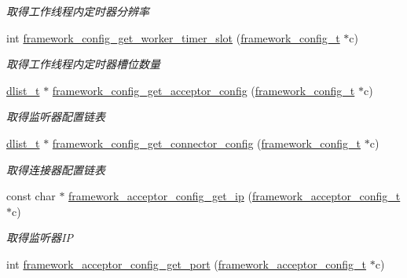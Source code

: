 \begin{DoxyCompactItemize}
\begin{DoxyCompactList}\small\item\em 取得工作线程内定时器分辨率 \end{DoxyCompactList}\item 
int \hyperlink{a00056_a644262b6c9e1d4dc33665782f3a27285_a644262b6c9e1d4dc33665782f3a27285}{framework\+\_\+config\+\_\+get\+\_\+worker\+\_\+timer\+\_\+slot} (\hyperlink{a00051_a55b26efa9e6ee05514d087ba2593a54b_a55b26efa9e6ee05514d087ba2593a54b}{framework\+\_\+config\+\_\+t} $\ast$c)
\begin{DoxyCompactList}\small\item\em 取得工作线程内定时器槽位数量 \end{DoxyCompactList}\item 
\hyperlink{a00051_ad6644d67df4b4e3596c1eb12977d1d16_ad6644d67df4b4e3596c1eb12977d1d16}{dlist\+\_\+t} $\ast$ \hyperlink{a00056_a83bfc56ba855d7e63fe8d02826925873_a83bfc56ba855d7e63fe8d02826925873}{framework\+\_\+config\+\_\+get\+\_\+acceptor\+\_\+config} (\hyperlink{a00051_a55b26efa9e6ee05514d087ba2593a54b_a55b26efa9e6ee05514d087ba2593a54b}{framework\+\_\+config\+\_\+t} $\ast$c)
\begin{DoxyCompactList}\small\item\em 取得监听器配置链表 \end{DoxyCompactList}\item 
\hyperlink{a00051_ad6644d67df4b4e3596c1eb12977d1d16_ad6644d67df4b4e3596c1eb12977d1d16}{dlist\+\_\+t} $\ast$ \hyperlink{a00056_ad6f3bd205eb112864ad9a26755e274af_ad6f3bd205eb112864ad9a26755e274af}{framework\+\_\+config\+\_\+get\+\_\+connector\+\_\+config} (\hyperlink{a00051_a55b26efa9e6ee05514d087ba2593a54b_a55b26efa9e6ee05514d087ba2593a54b}{framework\+\_\+config\+\_\+t} $\ast$c)
\begin{DoxyCompactList}\small\item\em 取得连接器配置链表 \end{DoxyCompactList}\item 
const char $\ast$ \hyperlink{a00056_a699a67643020ce0635b263ca82ba99bc_a699a67643020ce0635b263ca82ba99bc}{framework\+\_\+acceptor\+\_\+config\+\_\+get\+\_\+ip} (\hyperlink{a00051_a61a4e424ff4c86631423dedd97c40064_a61a4e424ff4c86631423dedd97c40064}{framework\+\_\+acceptor\+\_\+config\+\_\+t} $\ast$c)
\begin{DoxyCompactList}\small\item\em 取得监听器\+I\+P \end{DoxyCompactList}\item 
int \hyperlink{a00056_a438a9582850ffc05337892630cfdb3c7_a438a9582850ffc05337892630cfdb3c7}{framework\+\_\+acceptor\+\_\+config\+\_\+get\+\_\+port} (\hyperlink{a00051_a61a4e424ff4c86631423dedd97c40064_a61a4e424ff4c86631423dedd97c40064}{framework\+\_\+acceptor\+\_\+config\+\_\+t} $\ast$c)

\end{DoxyCompactItemize}

